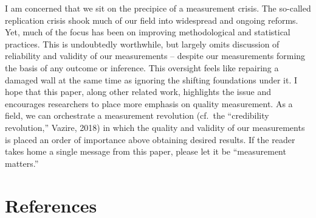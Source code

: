 \documentclass[
  english,
  man,floatsintext]{apa6}
\begin{document}
I am concerned that we sit on the precipice of a measurement crisis. The so-called replication crisis shook much of our field into widespread and ongoing reforms. Yet, much of the focus has been on improving methodological and statistical practices. This is undoubtedly worthwhile, but largely omits discussion of reliability and validity of our measurements -- despite our measurements forming the basis of any outcome or inference. This oversight feels like repairing a damaged wall at the same time as ignoring the shifting foundations under it. I hope that this paper, along other related work, highlights the issue and encourages researchers to place more emphasis on quality measurement. As a field, we can orchestrate a measurement revolution (cf.~the ``credibility revolution,'' Vazire, 2018) in which the quality and validity of our measurements is placed an order of importance above obtaining desired results. If the reader takes home a single message from this paper, please let it be ``measurement matters.''

\newpage

\hypertarget{references}{%
\section{References}\label{references}}

\begingroup
\setlength{\parindent}{-0.5in}
\setlength{\leftskip}{0.1in}
\end{document}
